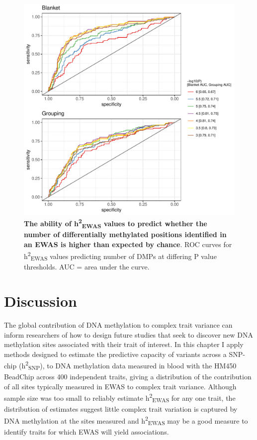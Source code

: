 \documentclass[11pt,oneside]{bristolthesis}
\begin{document}
\begin{figure}

{\centering \includegraphics[width=1\linewidth]{figure/05-h2ewas/roc_plot} 

}

\caption[The ability of h\textsuperscript{2}\textsubscript{EWAS} values to predict whether the number of differentially methylated positions identified in an EWAS is higher than expected by chance]{\textbf{The ability of h\textsuperscript{2}\textsubscript{EWAS} values to predict whether the number of differentially methylated positions identified in an EWAS is higher than expected by chance}. ROC curves for h\textsuperscript{2}\textsubscript{EWAS} values predicting number of DMPs at differing P value thresholds. AUC = area under the curve.}\label{fig:h2ewas-dmp-roc-curve}
\end{figure}
\hypertarget{discussion-05}{%
\section{Discussion}\label{discussion-05}}

The global contribution of DNA methylation to complex trait variance can inform researchers of how to design future studies that seek to discover new DNA methylation sites associated with their trait of interest. In this chapter I apply methods designed to estimate the predictive capacity of variants across a SNP-chip (h\textsuperscript{2}\textsubscript{SNP}), to DNA methylation data measured in blood with the HM450 BeadChip across 400 independent traits, giving a distribution of the contribution of all sites typically measured in EWAS to complex trait variance. Although sample size was too small to reliably estimate h\textsuperscript{2}\textsubscript{EWAS} for any one trait, the distribution of estimates suggest little complex trait variation is captured by DNA methylation at the sites measured and h\textsuperscript{2}\textsubscript{EWAS} may be a good measure to identify traits for which EWAS will yield associations.
\end{document}
